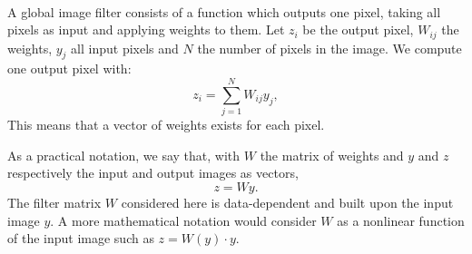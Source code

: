 \paragraph{}
A global image filter consists of a function which outputs one pixel, taking all pixels as input and applying weights to them.
\ifthesis
 Let \(z_i\) be the output pixel, \(W_{ij}\) the weights, \(y_j\) all input pixels and \(N\) the number of pixels in the image.
 We compute one output pixel with:
 \[z_i = \sum^{N}_{j=1} W_{ij}y_j,\]
 This means that a vector of weights exists for each pixel.
\fi

As a practical notation, we say that, with \(W\) the matrix of weights and \(y\) and \(z\) respectively the input and output images as vectors,
\[z = Wy.\]
The filter matrix \(W\) considered here is data-dependent and built upon the input image \(y\).
A more mathematical notation would consider \(W\) as a nonlinear function of the input image such as \(z = W(y) \cdot y\).
